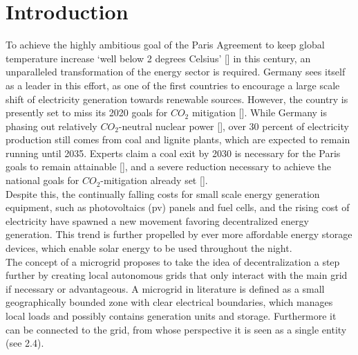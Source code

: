 \documentclass[
	11pt,								%
	DIV10,								%
	a4paper,         					%
	oneside,							%
	headheight=20pt,					%
	footheight=20pt,					%
    parskip=full,						%
    listof=totoc,						%
	bibliography=totoc,					%
	index=totoc,						%
]{scrartcl}
\begin{document}




\section{Introduction}
To achieve the highly ambitious goal of the Paris Agreement to keep global temperature increase `well below 2 degrees Celsius' [\cite{ParisAgreement2018}] in this century, an unparalleled transformation of the energy sector is required. Germany sees itself as a leader in this effort, as one of the first countries to encourage a large scale shift of electricity generation towards renewable sources. However, the country is presently set to miss its 2020 goals for $CO_2$ mitigation [\cite{oeiKohleausstiegNRWIm2018}]. While Germany is phasing out relatively $CO_2$-neutral nuclear power [\cite{NuclearPowerGermany2019}], over 30 percent of electricity production still comes from coal and lignite plants, which are expected to remain running until 2035. Experts claim a coal exit by 2030 is necessary for the Paris goals to remain attainable [\cite{yanguasparraScienceBasedCoal2018}], and a severe reduction necessary to achieve the national goals for $CO_2$-mitigation already set [\cite{goekeErfolgreicherKlimaschutzDurch2018}].
\\
Despite this, the continually falling costs for small scale energy generation equipment, such as photovoltaics (pv) panels and fuel cells, and the rising cost of electricity have spawned a new movement favoring decentralized energy generation. This trend is further propelled by ever more affordable energy storage devices, which enable solar energy to be used throughout the night.
\\
The concept of a microgrid proposes to take the idea of decentralization a step further by creating local autonomous grids that only interact with the main grid if necessary or advantageous.
A microgrid in literature is defined as a small geographically bounded zone with clear electrical boundaries, which manages local loads and possibly contains generation units and storage. Furthermore it can be connected to the grid, from whose perspective it is seen as a single entity (see 2.4). \\
\end{document}
